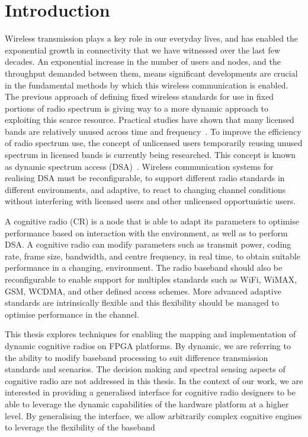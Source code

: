 \chapter{Introduction}
\label{chap:introduction}

Wireless transmission plays a key role in our everyday lives, and has enabled the exponential growth in connectivity that we have witnessed over the last few decades.
An exponential increase in the number of users and nodes, and the throughput demanded between them, means significant developments are crucial in the fundamental methods by which this wireless communication is enabled.
The previous approach of defining fixed wireless standards for use in fixed portions of radio spectrum is giving way to a more dynamic approach to exploiting this scarce resource.
Practical studies have shown that many licensed bands are relatively unused across time and frequency~\cite{FCC2002}.
To improve the efficiency of radio spectrum use, the concept of unlicensed users temporarily reusing unused spectrum in licensed bands is currently being researched.
This concept is known as dynamic spectrum access (DSA)~\cite{Minden}.
Wireless communication systems for realising DSA must be reconfigurable, to support different radio standards in different environments, and adaptive, to react to changing channel conditions without interfering with licensed users and other unlicensed opportunistic users.

A cognitive radio (CR) is a node that is able to adapt its parameters to optimise performance based on interaction with the environment, as well as to perform DSA.
A cognitive radio can modify parameters such as transmit power, coding rate, frame size, bandwidth, and centre frequency, in real time, to obtain suitable performance in a changing, environment.
The radio baseband should also be reconfigurable to enable support for multiples standards such as WiFi, WiMAX, GSM, WCDMA, and other defined access schemes.
More advanced adaptive standards are intrinsically flexible and this flexibility should be managed to optimise performance in the channel.

This thesis explores techniques for enabling the mapping and implementation of dynamic cognitive radios on FPGA platforms.
By dynamic, we are referring to the ability to modify baseband processing to suit difference transmission standards and scenarios.
The decision making and spectral sensing aspects of cognitive radio are not addressed in this thesis.
In the context of our work, we are interested in providing a generalised interface for cognitive radio designers to be able to leverage the dynamic capabilities of the hardware platform at a higher level.
By generalising the interface, we allow arbitrarily complex cognitive engines to leverage the flexibility of the baseband


